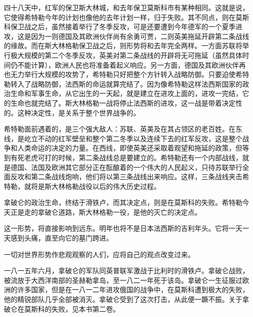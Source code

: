 四十八天中，红军的保卫斯大林城，和去年保卫莫斯科市有某种相同。这就是说，它使得希特勒今年的计划也像他的去年计划一样，归于失败。其不同点，则在莫斯科保卫战之后，虽然接着举行了冬季反攻，可是还要遭到今年德军的一个夏季进攻，这是因为一则德国及其欧洲伙伴尚有余勇可贾，二则英美拖延开辟第二条战线的缘故。而在斯大林格勒保卫战之后，则形势将和去年完全两样。一方面苏联将举行极大规模的第二个冬季反攻，英美对第二条战线的开辟将无可拖延（虽然具体时间仍不能计算），欧洲人民也将准备着起义响应。另一方面，德国及其欧洲伙伴再也无力举行大规模的攻势了，希特勒只好把整个方针转入战略防御。只要迫使希特勒转入了战略防御，法西斯的命运就算完结了。因为像希特勒这样法西斯国家的政治生命和军事生命，从它出生的一天起，就是建立在进攻上面的，进攻一完结，它的生命也就完结了。斯大林格勒一战将停止法西斯的进攻，这一战是带着决定性的。这种决定性，是关系于整个世界战争的。

希特勒面前遇着的，是三个强大敌人：苏联、英美及在其占领区的老百姓。在东线，是屹立不动的红军壁垒和整个第二冬季以及连续下去的红军反攻，这是整个战争和人类命运的决定的力量。在西线，即使英美还采取着观望和拖延的政策，但等到有死老虎可打的时候，第二条战线总是要建立的。希特勒还有一个内部战线，就是德国、法国及欧洲其它部分正在酝酿着的一个伟大的人民起义，只待苏联举行全面反攻和第二条战线炮响，他们将以第三条战线出来响应。这样，三条战线夹击希特勒，就将是斯大林格勒战役以后的伟大历史过程。

拿破仑的政治生命，终结于滑铁卢，而其决定点，则是在莫斯科的失败。希特勒今天正是走的拿破仑道路，斯大林格勒一役，是他的灭亡的决定点。

这一形势，将直接影响到远东。明年也将不是日本法西斯的吉利年头。它将一天一天感到头痛，直至向它的墓门跨进。

一切对世界形势作悲观观察的人们，应将自己的观点改变过来。


\begin{maonote}
一八一五年六月，拿破仑的军队同英普联军激战于比利时的滑铁卢。拿破仑战败，被流放于大西洋南部的圣赫勒拿岛，至一八二一年死于该岛。拿破仑一生征服过欧洲的许多国家，但是在一八一二年进攻俄国的战争中，在莫斯科遭到极大的失败，他的精锐部队几乎全部被消灭。拿破仑受到了这次打击，从此便一蹶不振。关于拿破仑在莫斯科的失败，见本书第二卷。
\end{maonote}
